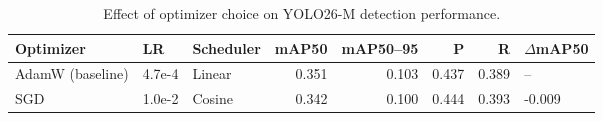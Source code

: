 \begin{table}[htbp]
\centering
\caption{Effect of optimizer choice on YOLO26-M detection performance.}
\label{tab:ablation-optimizer}
\begin{tabular}{lllrrrr}
\toprule
Optimizer & LR & Scheduler & mAP50 & mAP50--95 & P & R & $\Delta$mAP50 \\
\midrule
AdamW (baseline) & 4.7e-4 & Linear & 0.351 & 0.103 & 0.437 & 0.389 & -- \\
SGD & 1.0e-2 & Cosine & 0.342 & 0.100 & 0.444 & 0.393 & -0.009 \\
\bottomrule
\end{tabular}
\end{table}